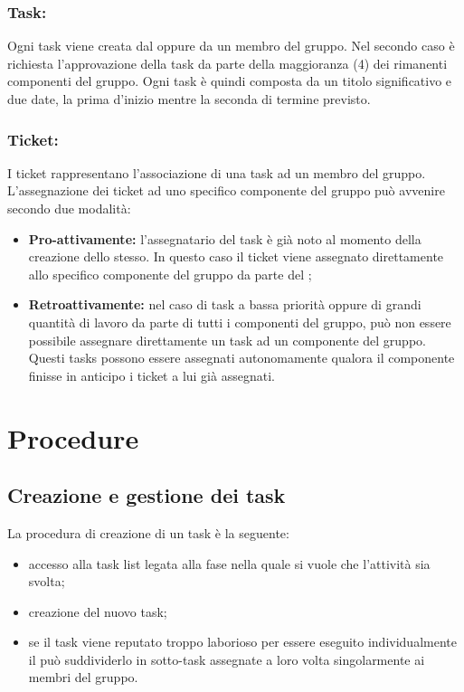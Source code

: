 \documentclass[NormeDiProgetto.tex]{subfiles}
\begin{document}
	\subsubsection{Task:}
	Ogni task viene creata dal \respdiprog{} oppure da un membro del gruppo. Nel secondo caso è richiesta l'approvazione della task da parte della maggioranza (4) dei rimanenti componenti del gruppo.
	Ogni task è quindi composta da un titolo significativo e due date, la prima d'inizio mentre la seconda di termine previsto.
	
	\subsubsection{Ticket:}
	I ticket rappresentano l'associazione di una task ad un membro del gruppo.
	L'assegnazione dei ticket ad uno specifico componente del gruppo può avvenire secondo due modalità:
	\begin{itemize}
		\item \textbf{Pro-attivamente:} l'assegnatario del task è già noto al momento della creazione dello stesso. In questo caso il ticket viene assegnato direttamente allo specifico componente del gruppo da parte del \respdiprog; 
		\item \textbf{Retroattivamente:} nel caso di task a bassa priorità oppure di grandi quantità di lavoro da parte di tutti i componenti del gruppo, può non essere possibile assegnare direttamente un task ad un componente del gruppo. Questi tasks possono essere assegnati autonomamente qualora il componente finisse in anticipo i ticket a lui già assegnati.
	\end{itemize}
	
	\section{Procedure}
	\subsection{Creazione e gestione dei task}	
	La procedura di creazione di un task è la seguente:
	\begin{itemize}
		\item accesso alla task list legata alla fase nella quale si vuole che l'attività sia svolta;
		\item creazione del nuovo task;
		\item se il task viene reputato troppo laborioso per essere eseguito individualmente il \respdiprog{} può suddividerlo in sotto-task assegnate a loro volta singolarmente ai membri del gruppo.	
	\end{itemize}		
	
\end{document}
